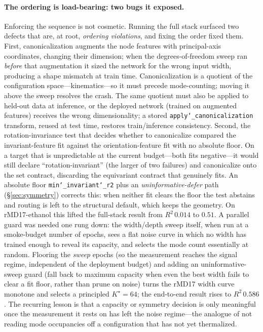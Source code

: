 \documentclass[11pt]{article}
\newcommand{\allowbreakhere}{\discretionary{}{}{}}
\newcommand{\code}[1]{\texttt{\def\_{\char`_\allowbreakhere}#1}}
\begin{document}
\paragraph{The ordering is load-bearing: two bugs it exposed.} Enforcing the sequence is not cosmetic.
Running the full stack surfaced two defects that are, at root, \emph{ordering violations}, and fixing
the order fixed them. First, canonicalization augments the node features with principal-axis
coordinates, changing their dimension; when the degrees-of-freedom sweep ran \emph{before} that
augmentation it sized the network for the wrong input width, producing a shape mismatch at train time.
Canonicalization is a quotient of the configuration space---kinematics---so it must precede
mode-counting; moving it above the sweep resolves the crash. The same quotient must also be applied to
held-out data at inference, or the deployed network (trained on augmented features) receives the wrong
dimensionality; a stored \code{apply\_canonicalization} transform, reused at test time, restores
train/inference consistency. Second, the rotation-invariance test that decides whether to canonicalize
compared the invariant-feature fit against the orientation-feature fit with no absolute floor. On a
target that is unpredictable at the current budget---both fits negative---it would still declare
``rotation-invariant'' (the larger of two failures) and canonicalize onto the set contract, discarding
the equivariant contract that genuinely fits. An absolute floor \code{min\_invariant\_r2} plus an
\emph{uninformative-defer} path (\S\ref{sec:symmetry}) corrects this: when neither fit clears
the floor the test abstains and routing is left to the structural default, which keeps the geometry.
On rMD17-ethanol this lifted the full-stack result from $R^2\,0.014$ to $0.51$. A parallel guard was
needed one rung down: the width/depth sweep itself, when run at a smoke-budget number of epochs, sees a
flat noise curve in which no width has trained enough to reveal its capacity, and selects the mode count
essentially at random. Flooring the \emph{sweep} epochs (so the measurement reaches the signal regime,
independent of the deployment budget) and adding an uninformative-sweep guard (fall back to maximum
capacity when even the best width fails to clear a fit floor, rather than prune on noise) turns the
rMD17 width curve monotone and selects a principled $K^\star=64$; the end-to-end result rises to
$R^2\,0.586$. The recurring lesson is that a capacity or symmetry decision is only meaningful once the
measurement it rests on has left the noise regime---the analogue of not reading mode occupancies off a
configuration that has not yet thermalized.
\end{document}
